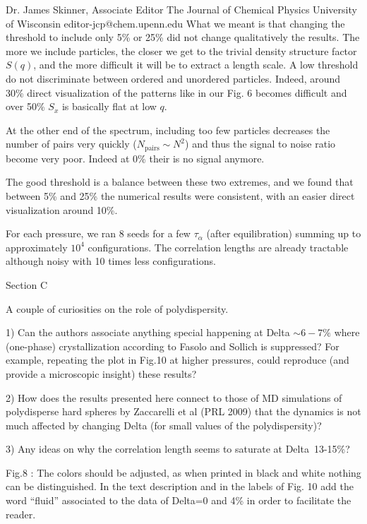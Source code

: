 \documentclass[a4paper, rebuttal, parskip=true, firsthead=false, fromemail=true, foldmarks=false]{scrlttr2}
\begin{document}
\begin{letter}{Dr. James Skinner, Associate Editor
The Journal of Chemical Physics
University of Wisconsin
editor-jcp@chem.upenn.edu }
What we meant is that changing the threshold to include only 5\% or 25\% did not change qualitatively the results. The more we include particles, the closer we get to the trivial density structure factor $S(q)$, and the more difficult it will be to extract a length scale. A low threshold do not discriminate between ordered and unordered particles. Indeed, around 30\% direct visualization of the patterns like in our Fig. 6 becomes difficult and over 50\% $S_x$ is basically flat at low $q$. 

At the other end of the spectrum, including too few particles decreases the number of pairs very quickly ($N_\text{pairs}\sim N^2$) and thus the signal to noise ratio become very poor. Indeed at 0\% their is no signal anymore.

The good threshold is a balance between these two extremes, and we found that between 5\% and 25\% the numerical results were consistent, with an easier direct visualization around 10\%.

For each pressure, we ran 8 seeds for a few $\tau_\alpha$ (after equilibration) summing up to approximately $10^4$ configurations. The correlation lengths are already tractable although noisy with 10 times less configurations.

\begin{quotationi}
Section C

A couple of curiosities on the role of polydispersity.

1) Can the authors associate anything special happening at Delta $\sim6-7\%$ where (one-phase) crystallization according to Fasolo and Sollich is suppressed? For example, repeating the plot in Fig.10 at higher pressures, could reproduce (and provide a microscopic insight) these results?
\end{quotationi}

\begin{quotationi}
2) How does the results presented here connect to those of MD simulations of polydisperse hard spheres by Zaccarelli et al (PRL 2009) that the dynamics is not much affected by changing Delta (for small values of the polydispersity)?
\end{quotationi}

\begin{quotationi}
3) Any ideas on why the correlation length seems to saturate at Delta~13-15\%?
\end{quotationi}

\begin{quotationi}
Fig.8 : The colors should be adjusted, as when printed in black and white nothing can be distinguished.
In the text description and in the labels of Fig. 10 add the word ``fluid'' associated to the data of Delta=0 and 4\% in order to facilitate the reader.
\end{quotationi}


\end{letter}
\end{document}
